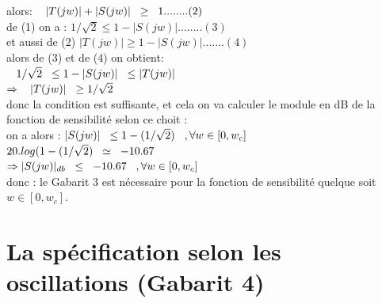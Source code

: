\documentclass[12pt, a4paper, openany]{report}
\begin{document}
alors: $\hspace{0.3cm} |T(jw)|+|S(jw)|\hspace{0.2cm}\geq \hspace{0.2cm} 1........(2)$\\  

de (1) on a : $1/\sqrt{2}\leq 1-|S(jw)|........(3)$ \\

et aussi de (2) $|T(jw)|\geq 1-|S(jw)|.......(4)$ \\

alors de (3) et de (4) on obtient: \\
 
 $\hspace{0.3cm} 1/\sqrt{2}\hspace{0.2cm} \leq 1-|S(jw)| \hspace{0.2cm}\leq |T(jw)|$ \\
 
 $\Rightarrow \hspace{0.3cm} |T(jw)| \hspace{0.2cm} \geq 1/\sqrt{2}$ \\
 
donc la condition est suffisante, et cela on va calculer le module en dB de la fonction de sensibilité selon ce choit : \\

on a alors : $|S(jw)|\hspace{0.2cm}\leq 1-(1/\sqrt{2}) \hspace{0.3cm} , \forall w\in[0,w_{c}] $ \\ 

 $20.log(1-(1/\sqrt{2})\hspace{0.2cm} \simeq \hspace{0.2cm} -10.67$  \\
 
 $\Rightarrow |S(jw)|_{db}\hspace{0.2cm} \leq \hspace{0.2cm} -10.67 \hspace{0.3cm} , \forall w\in[0,w_{c}] $  \\
 
 donc : le Gabarit 3 est nécessaire pour la fonction de sensibilité quelque soit $w\in[0,w_{c}]. $   
 
 
\section{La spécification selon les oscillations (Gabarit 4)}  %
\end{document}
